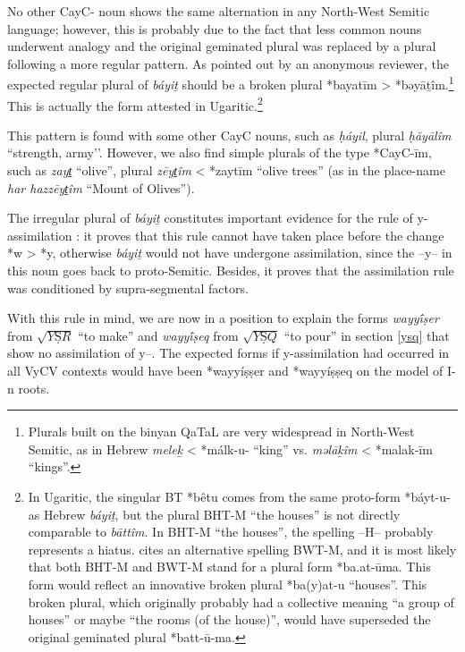 \documentclass[oldfontcommands,oneside,a4paper,11pt]{article}
\newcommand{\racine}[1]{\begin{math}\sqrt{#1}\end{math}}
\newcommand{\forme}[1]{\textit{#1}}
\begin{document}
\begin{sloppypar}
No other CayC- noun shows the same alternation in any North-West Semitic language; however, this is probably due to the fact that less common nouns underwent analogy and the original geminated plural was replaced by a plural following a more regular pattern. As pointed out by an anonymous reviewer, the expected regular plural of \forme{báyiṯ} should be a broken plural *bayatīm > *bəyāṯîm.\footnote{Plurals built on the binyan QaTaL are very widespread in North-West Semitic, as in Hebrew \forme{meleḵ} < *málk-u- ``king'' vs. \forme{mǝlāḵîm} < *malak-īm ``kings''.} This is actually the form attested in Ugaritic.\footnote{In Ugaritic, the singular BT *bêtu comes from the same proto-form *báyt-u-  as Hebrew \forme{báyiṯ}, but the plural BHT-M ``the houses'' is not directly comparable to \forme{bāttîm}.
In BHT-M ``the houses'', the spelling --H-- probably represents a hiatus. \citet[34-5]{sivan01ugaritic} cites an alternative spelling BWT-M, and it is most likely that both BHT-M and BWT-M stand for a plural form *ba.at-ūma. This form would reflect an innovative broken plural *ba(y)at-u ``houses''. This broken plural, which originally probably had a collective meaning ``a group of houses'' or maybe ``the rooms (of the house)'',  would have superseded the original geminated plural *batt-ū-ma. }

This pattern is found with some other CayC nouns, such as \forme{ḥáyil}, plural \forme{ḥăyālîm} ``strength, army'’. However, we  also find simple plurals of the type *CayC-īm, such as \forme{zayt̠} ``olive'',  plural  \forme{zēyt̠îm} < *zaytīm ``olive trees'' (as in the place-name  \forme{har hazzēyt̠îm} ``Mount of Olives'').



The irregular plural of \forme{báyiṯ} constitutes important evidence for the rule of y-assimilation : it proves that this rule cannot have taken place before the change *w > *y, otherwise \forme{báyiṯ} would not have undergone assimilation, since the --y-- in this noun  goes back to proto-Semitic. Besides, it proves that the assimilation rule was conditioned by supra-segmental factors.

With this rule in mind, we are now in a position to explain the forms \forme{wayyī́ṣer} from  \racine{YṢR} ``to make'' and  \forme{wayyī́ṣeq} from \racine{YṢQ}  ``to pour” in section \ref{ysq} that show no assimilation of y--. The expected forms if y-assimilation had occurred in all VyCV contexts would have been *wayyíṣṣer and *wayyíṣṣeq on the model of I-n roots.


\end{sloppypar}
\end{document}
